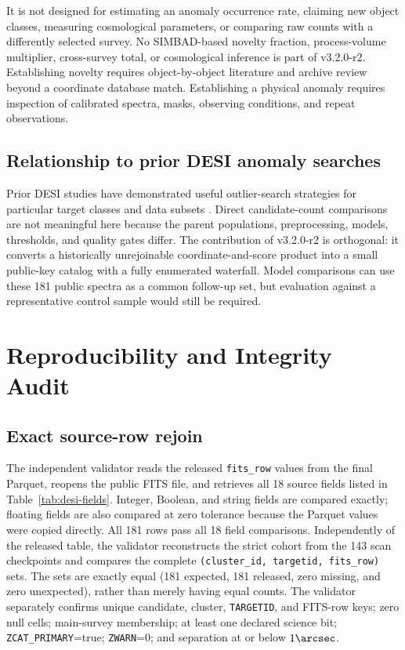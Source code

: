 \documentclass[twocolumn,linenumbers]{aastex702}
\newcommand{\releaseVersion}{v3.2.0-r2}
\begin{document}
It is not designed for estimating an anomaly occurrence rate, claiming new object classes,
measuring cosmological parameters, or comparing raw counts with a differently selected survey.
No SIMBAD-based novelty fraction, process-volume multiplier, cross-survey total, or cosmological
inference is part of \releaseVersion{}.  Establishing novelty requires object-by-object literature and archive
review beyond a coordinate database match.  Establishing a physical anomaly requires inspection
of calibrated spectra, masks, observing conditions, and repeat observations.

\subsection{Relationship to prior DESI anomaly searches}\label{sec:prior}

Prior DESI studies have demonstrated useful outlier-search strategies for particular target
classes and data subsets \citep{Liang2023,Nicolaou2026}.  Direct candidate-count comparisons are
not meaningful here because the parent populations, preprocessing, models, thresholds, and
quality gates differ.  The contribution of \releaseVersion{} is orthogonal: it converts a historically
unrejoinable coordinate-and-score product into a small public-key catalog with a fully enumerated
waterfall.  Model comparisons can use these 181 public spectra as a common follow-up set,
but evaluation against a representative control sample would still be required.

\section{Reproducibility and Integrity Audit}\label{sec:reproducibility}

\subsection{Exact source-row rejoin}\label{sec:exact-rejoin}

The independent validator reads the released \texttt{fits\_row} values from the final Parquet,
reopens the public FITS file, and retrieves all 18 source fields listed in
Table~\ref{tab:desi-fields}.  Integer, Boolean, and string fields are compared exactly; floating
fields are also compared at zero tolerance because the Parquet values were copied directly.
All 181 rows pass all 18 field comparisons.  Independently of the released table, the validator
reconstructs the strict cohort from the 143 scan checkpoints and compares the complete
\texttt{(cluster\_id, targetid, fits\_row)} sets.  The sets are exactly equal (181 expected,
181 released, zero missing, and zero unexpected), rather than merely having equal counts.
The validator separately confirms unique candidate,
cluster, \texttt{TARGETID}, and FITS-row keys; zero null cells; main-survey membership; at least one
declared science bit; \texttt{ZCAT\_PRIMARY}=true; \texttt{ZWARN}=0; and separation at or below
$1\arcsec$.
\end{document}
